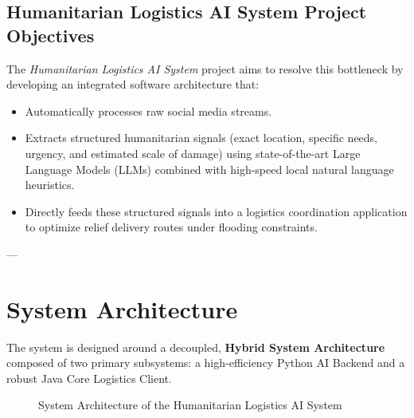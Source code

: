 \documentclass[12pt,a4paper]{article}
\begin{document}
\subsection{Humanitarian Logistics AI System Project Objectives}
The \textit{Humanitarian Logistics AI System} project aims to resolve this bottleneck by developing an integrated software architecture that:
\begin{itemize}
    \item Automatically processes raw social media streams.
    \item Extracts structured humanitarian signals (exact location, specific needs, urgency, and estimated scale of damage) using state-of-the-art Large Language Models (LLMs) combined with high-speed local natural language heuristics.
    \item Directly feeds these structured signals into a logistics coordination application to optimize relief delivery routes under flooding constraints.
\end{itemize}

---

\section{System Architecture}

The system is designed around a decoupled, \textbf{Hybrid System Architecture} composed of two primary subsystems: a high-efficiency Python AI Backend and a robust Java Core Logistics Client.

\begin{figure}[h!]
\centering
{}
\caption{System Architecture of the Humanitarian Logistics AI System}
\label{fig:architecture}
\end{figure}
\end{document}
